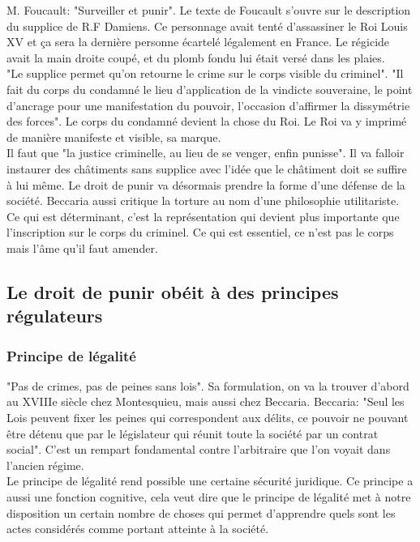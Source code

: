 \documentclass[10pt, a4paper, openany]{book}
\begin{document}
M. Foucault: "Surveiller et punir". Le texte de Foucault s'ouvre sur le description du supplice de R.F Damiens. Ce personnage avait tenté d'assassiner le Roi Louis XV et ça sera la dernière personne écartelé légalement en France. Le régicide avait la main droite coupé, et du plomb fondu lui était versé dans les plaies. \\
"Le supplice permet qu'on retourne le crime sur le corps visible du criminel". "Il fait du corps du condamné le lieu d'application de la vindicte souveraine, le point d'ancrage pour une manifestation du pouvoir, l'occasion d'affirmer la dissymétrie des forces". Le corps du condamné devient la chose du Roi. Le Roi va y imprimé de manière manifeste et visible, sa marque. \\
Il faut que "la justice criminelle, au lieu de se venger, enfin punisse". Il va falloir instaurer des châtiments sans supplice avec l'idée que le châtiment doit se suffire à lui même. Le droit de punir va désormais prendre la forme d'une défense de la société. Beccaria aussi critique la torture au nom d'une philosophie utilitariste. \\
Ce qui est déterminant, c'est la représentation qui devient plus importante que l'inscription sur le corps du criminel. Ce qui est essentiel, ce n'est pas le corps mais l'âme qu'il faut amender. 

\subsection{Le droit de punir obéit à des principes régulateurs}

\subsubsection{Principe de légalité}

"Pas de crimes, pas de peines sans lois". Sa formulation, on va la trouver d'abord  au XVIIIe siècle chez Montesquieu, mais aussi chez Beccaria. Beccaria: "Seul les Lois peuvent fixer les peines qui correspondent aux délits, ce pouvoir ne pouvant être détenu que par le législateur qui réunit toute la société par un contrat social". C'est un rempart fondamental contre l'arbitraire que l'on voyait dans l'ancien régime. \\
Le principe de légalité rend possible une certaine sécurité juridique. Ce principe a aussi une fonction cognitive, cela veut dire que le principe de légalité met à notre disposition un certain nombre de choses qui permet d'apprendre quels sont les actes considérés comme portant atteinte à la société. 
\end{document}
